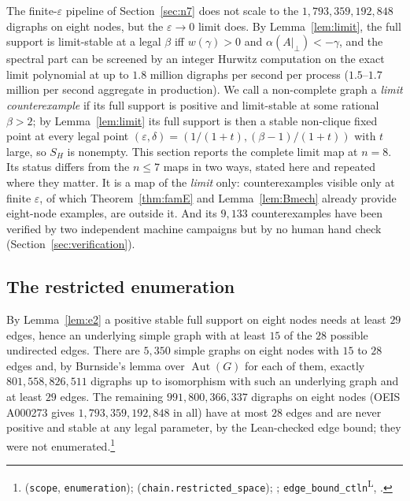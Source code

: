 \documentclass[11pt]{article}
\theoremstyle{definition}
\newcommand{\eps}{\varepsilon}
\newcommand{\perpc}[1]{#1|_{\perp}}
\newcommand{\lean}{\textsuperscript{\textsf{L}}}
\begin{document}
The finite-$\eps$ pipeline of Section~\ref{sec:n7} does not scale to the $1{,}793{,}359{,}192{,}848$ digraphs on eight
nodes, but the $\eps\to0$ limit does. By Lemma~\ref{lem:limit}, the full support is limit-stable at a legal $\beta$ iff
$w(\gamma)>0$ and $\alpha(\perpc{A})<-\gamma$, and the spectral part can be screened by an integer Hurwitz computation on
the exact limit polynomial at up to $1.8$ million digraphs per second per process ($1.5$--$1.7$ million per second aggregate in production). We call a non-complete graph a \emph{limit
counterexample} if its full support is positive and limit-stable at some rational $\beta>2$; by Lemma~\ref{lem:limit}
its full support is then a stable non-clique fixed point at every legal point $(\eps,\delta)=(1/(1+t),(\beta-1)/(1+t))$
with $t$ large, so $S_H$ is nonempty. This section reports the complete limit map at $n=8$. Its status differs from
the $n\le7$ maps in two ways, stated here and repeated where they matter. It is a map of the \emph{limit} only:
counterexamples visible only at finite $\eps$, of which Theorem~\ref{thm:famE} and Lemma~\ref{lem:Bmech} already
provide eight-node examples, are outside it. And its $9{,}133$ counterexamples have been verified by two independent
machine campaigns but by no human hand check (Section~\ref{sec:verification}).

\subsection{The restricted enumeration}
By Lemma~\ref{lem:e2} a positive stable full support on eight nodes needs at least $29$ edges, hence an underlying
simple graph with at least $15$ of the $28$ possible undirected edges. There are $5{,}350$ simple graphs on eight nodes
with $15$ to $28$ edges and, by Burnside's lemma over $\operatorname{Aut}(G)$ for each of them, exactly
$801{,}558{,}826{,}511$ digraphs up to isomorphism with such an underlying graph and at least $29$ edges. The remaining
$991{,}800{,}366{,}337$ digraphs on eight nodes (OEIS A000273 gives $1{,}793{,}359{,}192{,}848$ in all) have at most $28$
edges and are never positive and stable at any legal parameter, by the Lean-checked edge bound; they were not
enumerated.\footnote{ (\texttt{scope}, \texttt{enumeration});
 (\texttt{chain.restricted\_space}); ;
\texttt{edge\_bound\_ctln}\lean, .}
\end{document}

